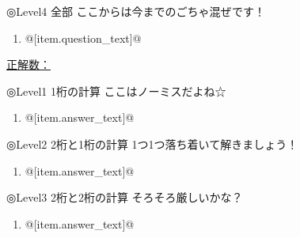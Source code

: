 \documentclass[uplatex,a4j,11pt]{jsarticle}
\begin{document}
\newpage

◎Level4 \hfill 全部 \hfill ここからは今までのごちゃ混ぜです！
　
\begin{minipage}[t][8.1cm][t]{\linewidth}
  \begin{multicols}{2}
    \begin{enumerate}
      \item @[item.question\_text]@
    \end{enumerate}
  \end{multicols}
\end{minipage}

\vfill

\begin{flushright}
  \underline{正解数：\hspace{6em}}
\end{flushright}

\newpage


◎Level1 \hfill 1桁の計算 \hfill ここはノーミスだよね☆

\begin{minipage}[t][8.1cm][t]{\linewidth}
  \begin{multicols}{2}
    \begin{enumerate}
      \item @[item.answer\_text]@
    \end{enumerate}
  \end{multicols}
\end{minipage}

\newpage

◎Level2 \hfill 2桁と1桁の計算 \hfill 1つ1つ落ち着いて解きましょう！
　
\begin{minipage}[t][8.1cm][t]{\linewidth}
  \begin{multicols}{2}
    \begin{enumerate}
      \item @[item.answer\_text]@
    \end{enumerate}
  \end{multicols}
\end{minipage}

\newpage

◎Level3 \hfill 2桁と2桁の計算 \hfill そろそろ厳しいかな？
　
\begin{minipage}[t][8.1cm][t]{\linewidth}
  \begin{multicols}{2}
    \begin{enumerate}
      \item @[item.answer\_text]@
    \end{enumerate}
  \end{multicols}
\end{minipage}
\end{document}
